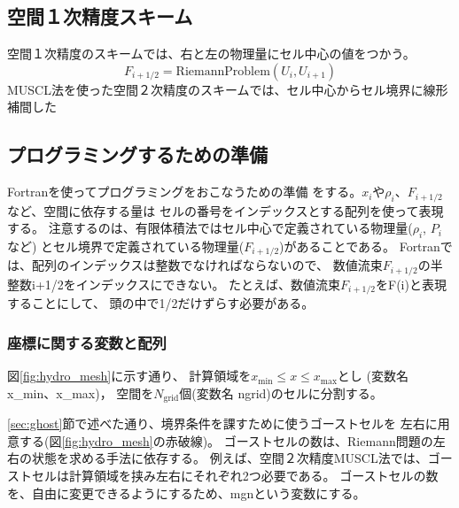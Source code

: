 \subsection{空間１次精度スキーム}
空間１次精度のスキームでは、右と左の物理量にセル中心の値をつかう。
\begin{equation}
    F_{i+1/2} = \mathrm{RiemannProblem}(U_i,U_{i+1})
\end{equation}
MUSCL法を使った空間２次精度のスキームでは、セル中心からセル境界に線形補間した


\vspace{2cm}
\newpage
\subsection{プログラミングするための準備}
Fortranを使ってプログラミングをおこなうための準備
をする。$x_i$や$\rho_i$、$F_{i+1/2}$など、空間に依存する量は
セルの番号をインデックスとする配列を使って表現する。
注意するのは、有限体積法ではセル中心で定義されている物理量($\rho_i$, $P_i$など)
とセル境界で定義されている物理量($F_{i+1/2}$)があることである。
Fortranでは、配列のインデックスは整数でなければならないので、
数値流束$F_{i+1/2}$の半整数{\ttfamily i+1/2}をインデックスにできない。
たとえば、数値流束$F_{i+1/2}$を{\ttfamily F(i)}と表現することにして、
頭の中で1/2だけずらす必要がある。

\subsubsection{座標に関する変数と配列}

図\ref{fig:hydro_mesh}に示す通り、
計算領域を$x_\mathrm{min}\le x\le x_\mathrm{max}$とし
(変数名 {\ttfamily x\_min}、{\ttfamily x\_max})，
空間を$N_\mathrm{grid}$個(変数名 {\ttfamily ngrid})のセルに分割する。

\ref{sec:ghost}節で述べた通り、境界条件を課すために使うゴーストセルを
左右に用意する(図\ref{fig:hydro_mesh}の赤破線)。
ゴーストセルの数は、Riemann問題の左右の状態を求める手法に依存する。
例えば、空間２次精度MUSCL法では、ゴーストセルは計算領域を挟み左右にそれぞれ2つ必要である。
ゴーストセルの数を、自由に変更できるようにするため、{\ttfamily mgn}という変数にする。


